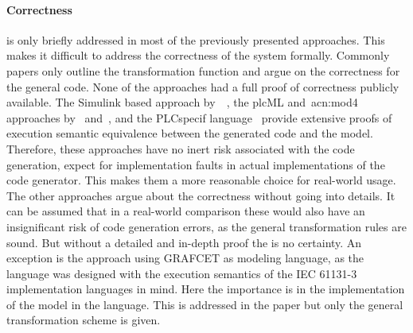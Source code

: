\paragraph{Correctness} is only briefly addressed in most of the previously presented approaches.
This makes it difficult to address the correctness of the system formally.
Commonly papers only outline the transformation function and argue on the correctness for the general code.
None of the approaches had a full proof of correctness publicly available.
The Simulink based approach by~\citeauthor{6489667}~\cite{6489667}, the plcML and~\acrshort{acn:mod4} approaches by~\citeauthor{WITSCH2015} and~\citeauthor{Obermeier:2015aa}, and the PLCspecif language~\cite{7819191, darvas2015syntax, darvas2015requirements, darvas2015formal, 10.1007/978-3-319-33693-0_32} provide extensive proofs of execution semantic equivalence between the generated code and the model.
Therefore, these approaches have no inert risk associated with the code generation, expect for implementation faults in actual implementations of the code generator.
This makes them a more reasonable choice for real-world usage.
The other approaches argue about the correctness without going into details.
It can be assumed that in a real-world comparison these would also have an insignificant risk of code generation errors, as the general transformation rules are sound.
But without a detailed and in-depth proof the is no certainty.
An exception is the approach using GRAFCET as modeling language, as the language was designed with the execution semantics of the IEC 61131-3 implementation languages in mind.
Here the importance is in the implementation of the model in the language.
This is addressed in the paper but only the general transformation scheme is given.

